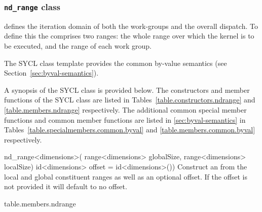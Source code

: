 \subsubsection{\texttt{nd_range} class}
\label{subsubsec:nd-range-class}



 defines the iteration domain of both
the work-groups and the overall dispatch. To define this the
 comprises two ranges: the whole range over which
the kernel is to be executed, and the range of each work
group.

The SYCL  class template provides the common by-value
semantics (see Section~\ref{sec:byval-semantics}).

A synopsis of the SYCL  class is provided below. The constructors and member functions of the SYCL  class are listed in Tables~\ref{table.constructors.ndrange} and \ref{table.members.ndrange} respectively. The additional common special member functions and common member functions are listed in \ref{sec:byval-semantics} in Tables~\ref{table.specialmembers.common.byval} and \ref{table.members.common.byval} respectively.

  \addRowFourL
    {nd_range<dimensions>(}
    {  range<dimensions> globalSize,}
    {  range<dimensions> localSize)}
    {  id<dimensions> offset = id<dimensions>())}
    {
        Construct an  from the local and global
        constituent ranges as well as an optional offset. If the
        offset is not provided it will default to no offset.
    }
  \completeTable

  {table.members.ndrange}

